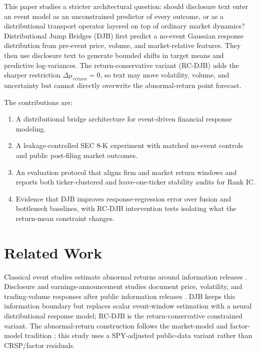 \documentclass[10pt,letterpaper]{article}
\begin{document}
This paper studies a stricter architectural question: should disclosure text enter an event model
as an unconstrained predictor of every outcome, or as a distributional transport operator layered
on top of ordinary market dynamics? Distributional Jump Bridges (DJB) first predict a no-event
Gaussian response distribution from pre-event price, volume, and market-relative features. They
then use disclosure text to generate bounded shifts in target means and predictive log-variances.
The return-conservative variant (RC-DJB) adds the sharper restriction
\(\Delta\mu_{return}=0\), so text may move volatility, volume, and uncertainty but cannot directly
overwrite the abnormal-return point forecast.

The contributions are:
\begin{enumerate}
    \item A distributional bridge architecture for event-driven financial response modeling.
    \item A leakage-controlled SEC 8-K experiment with matched no-event controls and public
    post-filing market outcomes.
    \item An evaluation protocol that aligns firm and market return windows and reports both
    ticker-clustered and leave-one-ticker stability audits for Rank IC.
    \item Evidence that DJB improves response-regression error over fusion and bottleneck
    baselines, with RC-DJB intervention tests isolating what the return-mean constraint changes.
\end{enumerate}

\section{Related Work}

Classical event studies estimate abnormal returns around information releases
\citep{fama1969adjustment,brown1985eventstudies,mackinlay1997eventstudies}. Disclosure and
earnings-announcement studies document price, volatility, and trading-volume responses after public
information releases \citep{beaver1968information,patell1984anticipated,bamber1986volume,
boehmer1991event,kothari2007econometrics}. DJB keeps this information boundary but replaces
scalar event-window estimation with a neural distributional response model; RC-DJB is the
return-conservative constrained variant. The abnormal-return
construction follows the market-model and factor-model tradition
\citep{sharpe1964capital,fama1993common,carhart1997persistence,kothari2007econometrics}; this
study uses a SPY-adjusted public-data variant rather than CRSP/factor residuals.
\end{document}

